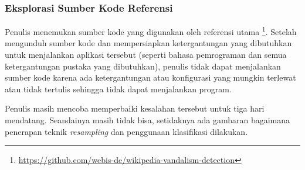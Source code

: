 \subsubsection{Eksplorasi Sumber Kode Referensi}

Penulis menemukan sumber kode yang digunakan oleh referensi utama
\footnote{
	\url{https://github.com/webis-de/wikipedia-vandalism-detection}
}.
Setelah mengunduh sumber kode dan mempersiapkan ketergantungan yang dibutuhkan untuk menjalankan aplikasi tersebut (seperti bahasa pemrograman dan semua ketergantungan pustaka yang dibutuhkan), penulis tidak dapat menjalankan sumber kode karena ada ketergantungan atau konfigurasi yang mungkin terlewat atau tidak tertulis sehingga tidak dapat menjalankan program.

Penulis masih mencoba memperbaiki kesalahan tersebut untuk tiga hari mendatang.
Seandainya masih tidak bisa, setidaknya ada gambaran bagaimana penerapan teknik \textit{resampling} dan penggunaan klasifikasi dilakukan.
